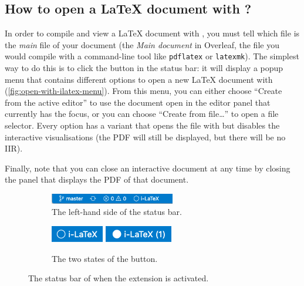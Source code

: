 \documentclass[11pt, a4paper]{article}
\begin{document}
\subsection{How to open a \LaTeX{} document with \iLaTeX{}?}
In order to compile and view a \LaTeX{} document with \iLaTeX{}, you must tell \iLaTeX{} which file is the \emph{main} file of your document (\ie the \emph{Main document} in Overleaf, the file you would compile with a command-line tool like \texttt{pdflatex} or \texttt{latexmk}).
The simplest way to do this is to click the \iLaTeX{} button in the status bar: it will display a popup menu that contains different options to open a new \LaTeX{} document with \iLaTeX{} (\autoref{fig:open-with-ilatex-menu}).
From this menu, you can either choose ``Create from the active editor'' to use the document open in the editor panel that currently has the focus, or you can choose ``Create from file\dots'' to open a file selector.
Every option has a variant that opens the file with \iLaTeX{} but disables the interactive visualisations (the PDF will still be displayed, but there will be no IIR).

Finally, note that you can close an interactive document at any time by closing the panel that displays the PDF of that document.

\begin{figure}[h]
    \centering
    \begin{subfigure}[b]{0.6\textwidth}
        \centering
        \includegraphics[width=0.6\textwidth]{img/vsc-status-bar-2.png}
        \caption{The left-hand side of the status bar.}
        \label{subfig:status-bar-with-ilatex-button}
    \end{subfigure}%
    \begin{subfigure}[b]{0.4\textwidth}
        \centering
        \includegraphics[scale = 0.5]{img/ilatex-button-off.png} \qquad
        \includegraphics[scale = 0.5]{img/ilatex-button-on.png}
        \caption{The two states of the \iLaTeX{} button.}
        \label{subfig:status-bar-buttons}
    \end{subfigure}
    \caption{The status bar of \vsc when the \iLaTeX{} extension is activated.}
    \label{fig:status-bar}
\end{figure}
\end{document}
